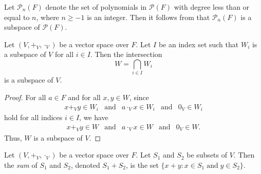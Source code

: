 \begin{example}
  Let $\mathcal{P}_n(F)$ denote the set of polynomials in $\mathcal{P}(F)$
  with degree less than or equal to $n$, where $n \geq -1$ is an integer.
  Then it follows from  that $\mathcal{P}_n(F)$ is
  a subspace of $\mathcal{P}(F)$.
\end{example}

\begin{theorem}\label{thm:intersection}
  Let $(V, +_V, \cdot_V)$ be a vector space over $F$.
  Let $I$ be an index set such that $W_i$ is a subspace of $V$
  for all $i \in I$.
  Then the intersection
  \begin{equation*}
    W = \bigcap_{i \in I} W_i
  \end{equation*}
  is a subspace of $V$.
\end{theorem}
\begin{proof}
  For all $a \in F$ and for all $x, y \in W$, since
  \begin{equation*}
    \begin{array}{lllll}
      x +_V y \in W_i
      & \text{and}
      & a \cdot_V x \in W_i
      & \text{and}
      & 0_V \in W_i
    \end{array}
  \end{equation*}
  hold for all indices $i \in I$, we have
  \begin{equation*}
    \begin{array}{lllll}
      x +_V y \in W
      & \text{and}
      & a \cdot_V x \in W
      & \text{and}
      & 0_V \in W.
    \end{array}
  \end{equation*}
  Thus, $W$ is a subspace of $V$.
\end{proof}

\begin{definition}\label{def:sum-of-sets}
  Let $(V, +_V, \cdot_V)$ be a vector space over $F$.
  Let $S_1$ and $S_2$ be subsets of $V$.
  Then the \emph{sum} of $S_1$ and $S_2$, denoted $S_1 + S_2$,
  is the set
  $\{x + y: x \in S_1 \;\text{and}\; y \in S_2\}$.
\end{definition}

